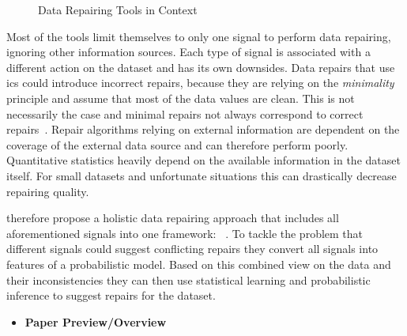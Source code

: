 \begin{figure*}[hbt]

    \caption{Data Repairing Tools in Context}
    \label{fig:tools}
  \end{figure*}

  \bigskip
  Most of the tools limit themselves to only one signal to perform data repairing, ignoring other information sources.
  Each type of signal is associated with a different action on the dataset and has its own downsides.
  Data repairs that use \glspl{ic} could introduce incorrect repairs, because they are relying on the \textit{minimality} principle and assume that most of the data values are clean.
  This is not necessarily the case and minimal repairs not always correspond to correct repairs~\cite{holoclean}.
  Repair algorithms relying on external information are dependent on the coverage of the external data source and can therefore perform poorly.
  Quantitative statistics heavily depend on the available information in the dataset itself.
  For small datasets and unfortunate situations this can drastically decrease repairing quality.
  
  \citeauthor{holoclean} therefore propose a holistic data repairing approach that includes all aforementioned signals into one framework: \holoclean{}~\cite{holoclean}.
  To tackle the problem that different signals could suggest conflicting repairs they convert all signals into features of a probabilistic model.
  Based on this combined view on the data and their inconsistencies they can then use statistical learning and probabilistic inference to suggest repairs for the dataset.
  
  \begin{itemize}
    \item \textbf{Paper Preview/Overview}
  \end{itemize}


